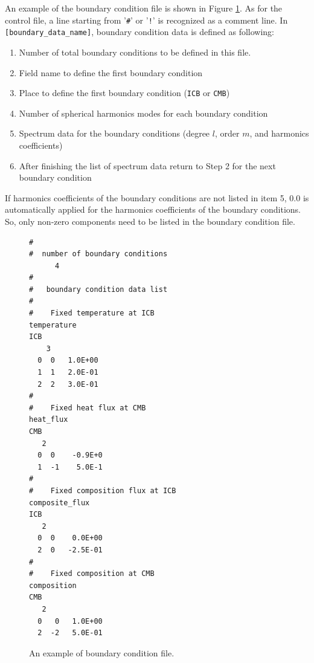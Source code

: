 An example of the boundary condition file is shown in Figure \ref{fig:boundary_file}. As for the control file, a line starting from '\verb|#|' or '\verb|!|' is recognized as a comment line. In \verb|[boundary_data_name]|, boundary condition data is defined as following:
%
\begin{enumerate}
\item  Number of total boundary conditions to be defined in this file.
\item  Field name to define the first boundary condition
\item  Place to define the first boundary condition (\verb|ICB| or \verb|CMB|)
\item  Number of spherical harmonics modes for each boundary condition
\item  Spectrum data for the boundary conditions (degree $l$, order $m$, and harmonics coefficients)
\item  After finishing the list of spectrum data return to Step 2 for the next boundary condition
\end{enumerate}
%
If harmonics coefficients of the boundary conditions are not listed in item 5, 0.0 is automatically applied for the harmonics coefficients of the boundary conditions. So, only non-zero components need to be listed in the boundary condition file.

%
\begin{figure}[htbp]
\begin{center}
\begin{verbatim}
#
#  number of boundary conditions
      4
#
#   boundary condition data list
#
#    Fixed temperature at ICB
temperature
ICB
    3
  0  0   1.0E+00
  1  1   2.0E-01
  2  2   3.0E-01
#
#    Fixed heat flux at CMB
heat_flux
CMB
   2
  0  0    -0.9E+0
  1  -1    5.0E-1
#
#    Fixed composition flux at ICB
composite_flux
ICB
   2
  0  0    0.0E+00
  2  0   -2.5E-01
#
#    Fixed composition at CMB
composition
CMB
   2
  0   0   1.0E+00
  2  -2   5.0E-01
\end{verbatim}
\end{center}
\caption{An example of boundary condition file.}
\label{fig:boundary_file}
\end{figure}
%



